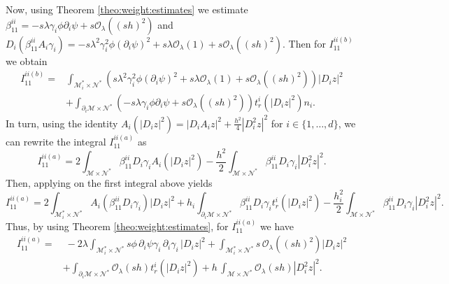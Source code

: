 \documentclass[11pt,oneside,leqno]{amsart}
\numberwithin{equation}{section}
\numberwithin{equation}{section}
\begin{document}
Now, using Theorem \ref{theo:weight:estimates} we estimate $\beta_{11}^{ii}=-    s\lambda\gamma_{i}\phi\partial_{i}\psi+s\mathcal{O}_{\lambda}((sh)^{2})$ and $D_{i}(\beta_{11}^{ii}A_{i}\gamma_{i})=-s\lambda^{2}\gamma_{i}^{2}\phi(\partial_{i}\psi)^{2}+s\lambda\mathcal{O}_{\lambda}(1)+s\mathcal{O}_{\lambda}((sh)^{2})$. Then for $I_{11}^{ii(b)}$ we obtain
\begin{equation}\label{eq:J11b}
\begin{aligned}
I_{11}^{ii(b)}=&\int_{\mathcal{M}^{\ast}_{i}\times\mathcal{N}^{\ast}}\left(s\lambda^{2}\gamma_{i}^{2}\phi(\partial_{i}\psi)^{2}+s\lambda\mathcal{O}_{\lambda}(1)+s\mathcal{O}_{\lambda}((sh)^{2})\right)|D_{i}z|^{2}\\
&+\int_{\partial_{i}\mathcal{M}\times\mathcal{N}^{\ast}}(-    s\lambda\gamma_{i}\phi\partial_{i}\psi+s\mathcal{O}_{\lambda}((sh)^{2}))t_{r}^{i}(|D_{i}z|^{2})n_{i}.
\end{aligned}
\end{equation}
In turn, using the identity $A_{i}(|D_{i}z|^{2})=|D_{i}A_{i}z|^{2}+\frac{h^{2}}{4}|D_{i} ^{2}z|^{2}$ for $i\in\{1,\ldots,d\}$, we can rewrite the integral $I_{11}^{ii(a)}$ as
\begin{equation*}
    I_{11}^{ii(a)}=2\int_{\mathcal{M}\times\mathcal{N}^{\ast}}\beta_{11}^{ii}D_{i}\gamma_{i}A_{i}(|D_{i}z|^{2})-\frac{h^{2}}{2}\int_{\mathcal{M}\times\mathcal{N}^{\ast}}\beta_{11}^{ii}D_{i}\gamma_{i}|D_{i}^{2}z|^{2}.
\end{equation*}
    Then, applying \cite[Lemma 2.2, equation (16)]{LDOP-2021} on the first integral above yields
\begin{equation}
    I_{11}^{ii(a)}=2\int_{\mathcal{M}^{\ast}_{i}\times\mathcal{N}^{\ast}}A_{i}(\beta_{11}^{ii}D_{i}\gamma_{i})|D_{i}z|^{2}+h_{i}\int_{\partial_{i}\mathcal{M}\times\mathcal{N}^{\ast}}\beta_{11}^{ii}D_{i}\gamma_{i}t_{r}^{i}(|D_{i}z|^{2})-\frac{h_{i}^{2}}{2}\int_{\mathcal{M}\times\mathcal{N}^{\ast}}\beta_{11}^{ii}D_{i}\gamma_{i}|D^{2}_{i}z|^{2}.
\end{equation}
 Thus, by using Theorem \ref{theo:weight:estimates}, for $I_{11}^{ii(a)}$ we have 
\begin{equation}\label{eq:I11:ii:a:final}
\begin{aligned}
I_{11}^{ii(a)}=&\;-2\lambda\int_{\mathcal{M}^{\ast}_{i}\times\mathcal{N}^{\ast}}s
\phi\,\partial_{i}\psi\gamma_{i}\,\partial_{i}\gamma_{i}\,|D_{i}z|^{2}
+
\int_{\mathcal{M}^{\ast}_{i}\times\mathcal{N}^{\ast}}s\,\mathcal{O}_{\lambda}((sh)^{2})|D_{i}z|^{2}\\
&+
\int_{\partial_{i}\mathcal{M}\times\mathcal{N}^{\ast}}
\mathcal{O}_{\lambda}(sh)t_{r}^{i}(|D_{i}z|^{2})
+h\,
\int_{\mathcal{M}\times\mathcal{N}^{\ast}}\mathcal{O}_{\lambda}(sh)|D_{i}^{2}z|^{2}.
\end{aligned}
\end{equation}
\end{document}
